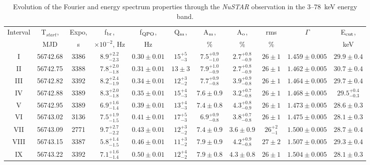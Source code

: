 \documentclass[a4paper,fleqn,usenatbib]{mnras}
\begin{document}
\begin{table}
\noindent
\centering
\caption{Evolution of the Fourier and energy spectrum properties through the {\it NuSTAR} observation in the 3--78~keV energy band.}
\label{tab:timing}
\centering
\begin{tabular}{|c|c|c|c|c|c|c|c|c|c|c|}
\hline\hline
Interval    & T$_{start}$,  & Expo,     & f$_{\rm br}$,                     & f$_{\rm QPO}$, & Q$_{\rm m}$,     & A$_{\rm m}$,  & A$_{\rm o}$,      & rms & $\Gamma$ & E$_{\rm cut}$, \\
            &  MJD          &  s        & $\times10^{-2}$, Hz               &  Hz            &   & \%            &  \%               &   \%       &          &  keV             \\
\hline
I           & 56742.68      & 3386      & $8.9_{-2.3}^{+2.2}$  & $0.30\pm0.01$ & $15_{-3}^{+5}$ & $7.5_{-1.0}^{+0.9}$ & $2.7_{-0.9}^{+0.8}$ & $26\pm1$ & $1.459\pm0.005$ & $29.9\pm0.4$ \\
II & 56742.75 & 3388 & $7.8_{-1.8}^{+2.0}$ & $0.31\pm0.01$ & $13\pm3$ & $7.9_{-0.9}^{+1.0}$ & $2.7_{-0.9}^{+0.8}$ & $26\pm1$ & $1.462\pm0.005$ & $30.7\pm0.4$ \\
III & 56742.82 & 3392 & $8.2_{-1.9}^{+2.4}$ & $0.34\pm0.01$ & $12_{-2}^{+3}$ & $7.7_{-0.8}^{+0.9}$ & $3.9_{-0.8}^{+0.9}$ & $26\pm1$ & $1.464\pm0.005$ & $29.7\pm0.4$ \\
IV & 56742.88 & 3389 & $8.3_{-1.8}^{+2.0}$ & $0.35\pm0.01$ & $15_{-3}^{+4}$ & $7.6\pm0.9$ & $3.2_{-0.8}^{+0.7}$ & $26\pm1$ & $1.468\pm0.005$ & $29.5_{-0.3}^{+0.4}$ \\
V & 56742.95 & 3389 & $6.9_{-1.4}^{+1.6}$ & $0.39\pm0.01$ & $13_{-3}^{+4}$ & $7.4\pm0.8$ & $4.3_{-0.9}^{+0.8}$ & $26\pm1$ & $1.473\pm0.005$ & $28.6\pm0.3$ \\
VI & 56743.02 & 3136 & $7.5_{-1.5}^{+1.9}$ & $0.41\pm0.01$ & $17_{-3}^{+5}$ & $6.9_{-0.8}^{+0.9}$ & $3.8_{-0.8}^{+0.7}$ & $26\pm1$ & $1.475\pm0.005$ & $28.1\pm0.3$ \\
VII & 56743.09 & 2771 & $9.7_{-2.2}^{+2.7}$ & $0.43\pm0.01$ & $12_{-2}^{+3}$ & $7.4\pm0.9$ & $3.6\pm0.9$ & $26_{-1}^{+2}$ & $1.500\pm0.005$ & $28.7\pm0.4$ \\
VIII & 56743.15 & 3387 & $5.8_{-1.5}^{+1.4}$ & $0.46\pm0.01$ & $11_{-2}^{+3}$ & $7.9\pm0.9$ & $4.2_{-0.8}^{+0.9}$ & $27\pm2$ & $1.507\pm0.005$ & $29.3\pm0.4$ \\
IX & 56743.22 & 3392 & $7.1_{-1.4}^{+1.6}$ & $0.50\pm0.01$ & $12_{-2}^{+4}$ & $7.9\pm0.8$ & $4.3\pm0.8$ & $26\pm1$ & $1.504\pm0.005$ & $28.1\pm0.3$ \\

\end{tabular}
\end{table}
\end{document}

